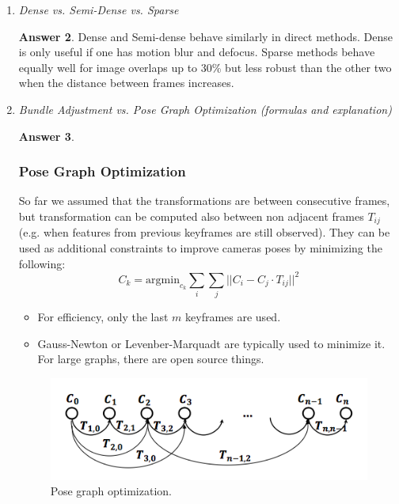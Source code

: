 \documentclass[a4paper,12 pt]{article}
\theoremstyle{definition}
\theoremstyle{remark}
\theoremstyle{definition}
\theoremstyle{definition}
\theoremstyle{definition}
\theoremstyle{definition}
\theoremstyle{remark}
\theoremstyle{remark}
\theoremstyle{definition}
\theoremstyle{definition}
\newtheorem*{answer}{Answer}
\begin{document}
\begin{enumerate}
\begin{enumerate}
\begin{answer}
\begin{enumerate}
\item Local optimization (\textbf{back end}).
\end{enumerate}
\end{answer}
\item \textit{Dense vs. Semi-Dense vs. Sparse}
\begin{answer}
 Dense and Semi-dense behave similarly in direct methods. Dense is only useful if one has motion blur and defocus.  Sparse methods behave equally well for image overlaps up to 30\% but less robust than the other two when the distance between frames increases.
\end{answer}
\item \textit{Bundle Adjustment vs. Pose Graph Optimization (formulas and explanation)}
\begin{answer}\
\subsubsection*{Pose Graph Optimization}
So far we assumed that the transformations are between consecutive frames, but transformation can be computed also between non adjacent frames $T_{ij}$ (e.g. when features from previous keyframes are still observed). They can be used as additional constraints to improve cameras poses by minimizing the following:
\begin{equation}
C_k=\text{argmin}_{c_k} \sum_{i} \sum_{j} ||C_i-C_j\cdot T_{ij}||^2
\end{equation}
\begin{itemize}
\item For efficiency, only the last $m$ keyframes are used.
\item Gauss-Newton or Levenber-Marquadt are typically used to minimize it. For large graphs, there are open source things.
\end{itemize}
\begin{figure}[h!]
\begin{center}
\includegraphics[scale=0.5]{pics/pose}
\caption{Pose graph optimization.}
\end{center}
\end{figure}

\end{answer}
\end{enumerate}
\end{enumerate}
\end{document}
